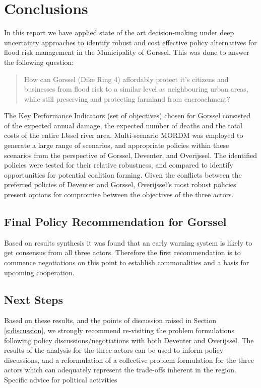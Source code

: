 \section{Conclusions}
\label{s:conc}


In this report we have applied state of the art decision-making under deep uncertainty approaches to identify robust and cost effective policy alternatives for flood risk management in the Municipality of Gorssel. This was done to answer the following question:
\begin{quote}
    How can Gorssel (Dike Ring 4) affordably protect it's citizens and businesses from flood risk to a similar level as neighbouring urban areas, while still preserving and protecting farmland from encroachment?
\end{quote} 

The Key Performance Indicators (set of objectives) chosen for Gorssel consisted of the expected annual damage, the expected number of deaths and the total costs of the entire IJssel river area. Multi-scenario MORDM was employed to generate a large range of scenarios, and appropriate policies within these scenarios from the perspective of Gorssel, Deventer, and Overijssel. The identified policies were tested for their relative robustness, and compared to identify opportunities for potential coalition forming. Given the conflicts between the preferred policies of Deventer and Gorssel, Overijssel's most robust policies present options for compromise between the objectives of the three actors.

\subsection{Final Policy Recommendation for Gorssel}
Based on results synthesis it was found that an early warning system is likely to get consensus from all three actors. Therefore the first recommendation is to commence negotiations on this point to establish commonalities and a basis for upcoming cooperation.

\subsection{Next Steps}
Based on these results, and the points of discussion raised in Section \ref{s:discussion}, we strongly recommend re-visiting the problem formulations following policy discussions/negotiations with both Deventer and Overijssel. The results of the analysis for the three actors can be used to inform policy discussions, and a reformulation of a collective problem formulation for the three actors which can adequately represent the trade-offs inherent in the region. Specific advice for political activities 

